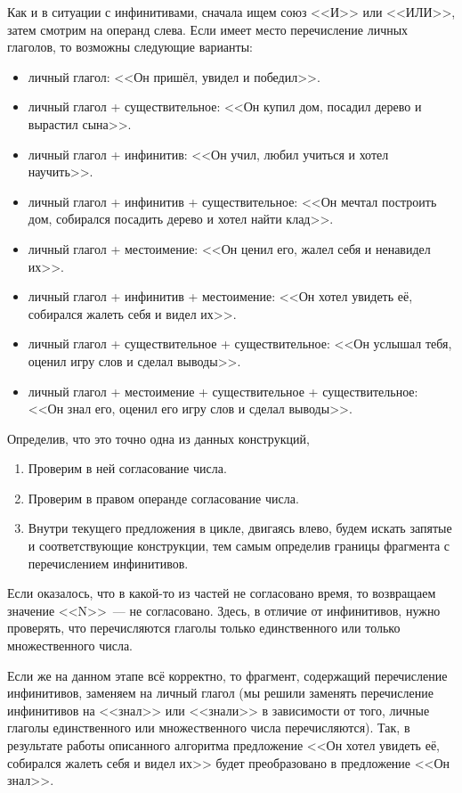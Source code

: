 \documentclass[a4paper,12pt]{article} %
\theoremstyle{definition}
\theoremstyle{plain}
\begin{document}
Как и в ситуации с инфинитивами, сначала ищем союз <<И>> или <<ИЛИ>>, затем смотрим на операнд слева. Если имеет место перечисление личных глаголов, то возможны следующие варианты:\begin{itemize}
	\item личный глагол: <<Он пришёл, увидел и победил>>.
	\item личный глагол + существительное: <<Он купил дом, посадил дерево и вырастил сына>>.
	\item личный глагол + инфинитив: <<Он учил, любил учиться и хотел научить>>.
	\item личный глагол + инфинитив + существительное: <<Он мечтал построить дом, собирался посадить дерево и хотел найти клад>>.
	\item личный глагол + местоимение: <<Он ценил его, жалел себя и ненавидел их>>.
	\item личный глагол + инфинитив + местоимение: <<Он хотел увидеть её, собирался жалеть себя и видел их>>.
	\item личный глагол + существительное + существительное: <<Он услышал тебя, оценил игру слов и сделал выводы>>.
	\item личный глагол + местоимение + существительное + существительное: <<Он знал его, оценил его игру слов и сделал выводы>>.
\end{itemize}
Определив, что это точно одна из данных конструкций, \begin{enumerate}
	\item Проверим в ней согласование числа.
	\item Проверим в правом операнде согласование числа.
	\item Внутри текущего предложения в цикле, двигаясь влево, будем искать запятые и соответствующие конструкции, тем самым определив границы фрагмента с перечислением инфинитивов.
\end{enumerate}

Если оказалось, что в какой-то из частей не согласовано время, то возвращаем значение <<N>>~--- не согласовано. Здесь, в отличие от инфинитивов, нужно проверять, что перечисляются глаголы только единственного или только множественного числа.

Если же на данном этапе всё корректно, то фрагмент, содержащий перечисление инфинитивов, заменяем на личный глагол (мы решили заменять перечисление инфинитивов на <<знал>> или <<знали>> в зависимости от того, личные глаголы единственного или множественного числа перечисляются). Так, в результате работы описанного алгоритма предложение <<Он хотел увидеть её, собирался жалеть себя и видел их>> будет преобразовано в предложение <<Он знал>>.
\end{document}
